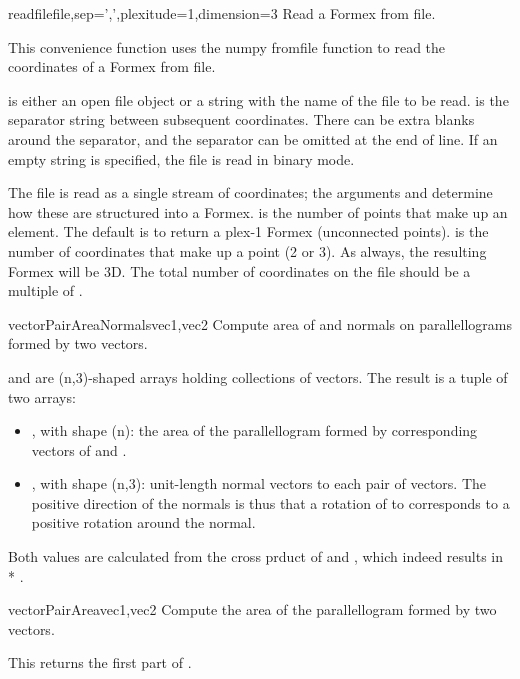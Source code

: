 \begin{funcdesc}{readfile}{file,sep=',',plexitude=1,dimension=3}
Read a Formex from file.

This convenience function uses the numpy fromfile function to read the coordinates of a Formex from file. 

 is either an open file object or a string with the name of the file to be read.
 is the separator string between subsequent coordinates. There can be extra blanks around the separator, and the separator can be omitted at the end of line. If an empty string is specified, the file is read in binary mode.

The file is read as a single stream of coordinates; the arguments  and  determine how these are structured into a Formex.
 is the number of points that make up an element. The default is to return a plex-1 Formex (unconnected points).
 is the number of coordinates that make up a point (2 or 3). As always, the resulting Formex will be 3D.
The total number of coordinates on the file should be a multiple of .
\end{funcdesc}


\begin{funcdesc}{vectorPairAreaNormals}{vec1,vec2}
Compute area of and normals on parallellograms formed by two vectors.

 and  are (n,3)-shaped arrays holding collections of vectors. 
The result is a tuple of two arrays:
\begin{itemize}
\item {}, with shape (n): the area of the parallellogram formed by corresponding vectors of  and .
\item {}, with shape (n,3): unit-length normal vectors to each pair of vectors. The positive direction of the normals is thus that a rotation of  to  corresponds to a positive rotation around the normal.
\end{itemize}
Both values are calculated from the cross prduct of  and , which indeed results in  * .
\end{funcdesc}

\begin{funcdesc}{vectorPairArea}{vec1,vec2}
Compute the area of the parallellogram formed by two vectors.

This returns the first part of .
\end{funcdesc}

